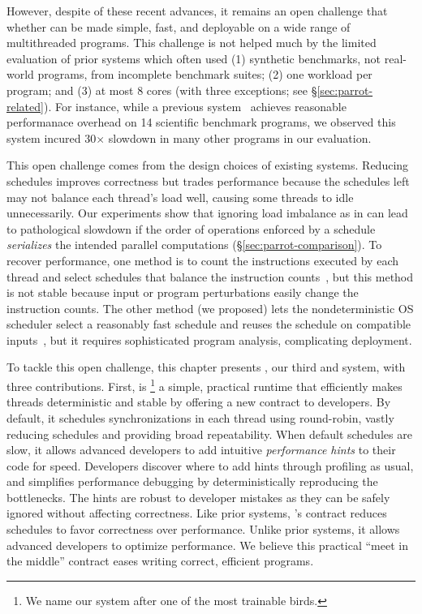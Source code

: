 However, despite of these recent advances, it remains an
open challenge that whether \smt can be made simple, fast, and deployable on a
wide range of multithreaded programs.  
This challenge is not helped much by the limited
evaluation of prior systems which often used (1) synthetic benchmarks, not
real-world programs, from incomplete benchmark suites; (2) one workload
per program; and (3) at most 8 cores (with three exceptions; see
\S\ref{sec:parrot-related}). For instance, while a previous
system~\cite{dthreads:sosp11} achieves reasonable performanace overhead on 14
scientific benchmark programs, we observed
this system incured 30$\times$ slowdown in many other programs in our
evaluation.

This open challenge comes from the design choices of existing \smt systems. 
Reducing schedules improves correctness
but trades performance because the schedules left may not balance each
thread's load well, causing some threads to idle unnecessarily.  Our
experiments show that ignoring load imbalance as in \dthreads
can lead to pathological
slowdown if the order of operations enforced by a schedule
\emph{serializes} the intended parallel computations
(\S\ref{sec:parrot-comparison}).  To recover performance, one method is to count
the instructions executed by each thread and select schedules that balance
the instruction counts~\cite{kendo:asplos09, coredet:asplos10,
  dmp:asplos09}, but this method is not stable because input or program
perturbations easily change the instruction counts.  The other method (we
proposed)
lets the nondeterministic OS scheduler select
a reasonably fast schedule and reuses the schedule on
compatible inputs~\cite{cui:tern:osdi10,peregrine:sosp11}, but it
requires sophisticated program analysis, complicating deployment.



To tackle this open challenge, this chapter presents \parrot, our third \smt and
\dmt system, with three contributions.
First, \parrot is \footnote{We name our system after one of the most
  trainable birds.} a simple, practical runtime that efficiently makes
threads deterministic and stable by offering a new contract to developers.
By default, it schedules synchronizations in each thread using
round-robin, vastly reducing schedules and providing broad repeatability.
When default schedules are slow, it allows advanced developers to add
intuitive \emph{performance hints} to their code for speed.  Developers discover
where to add hints through profiling as usual, and \parrot simplifies
performance debugging by deterministically reproducing the bottlenecks.
The hints are robust to developer mistakes as they can be safely ignored
without affecting correctness. Like prior systems, \parrot's contract reduces
schedules to favor correctness over performance.  Unlike prior systems, it
allows advanced developers
to optimize performance.  We believe this practical ``meet in the
middle'' contract eases writing correct, efficient programs.



